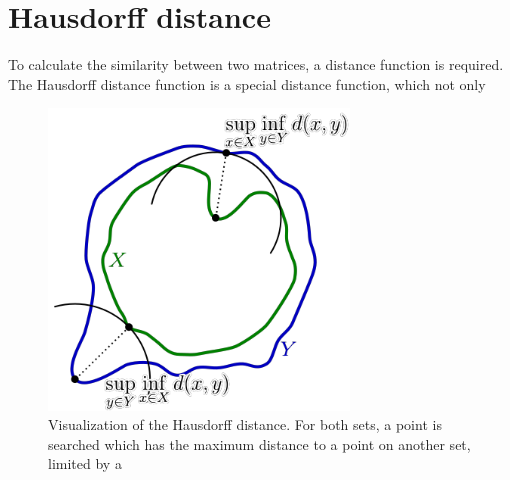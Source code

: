 \section{Hausdorff distance}

To calculate the similarity between two matrices, a distance function is required. The Hausdorff distance function is a special distance function,
which not only 

\begin{figure}[H]
\centering
\includegraphics[width=8cm]{chapters/06_hdm/images/hausdorff_distance.png}
\caption{Visualization of the Hausdorff distance. For both sets, a point is searched which has the maximum distance to a point on another set, limited by a \cite{hausdorffdistanceimage}}
\label{hausdorff_distance}
\end{figure}

